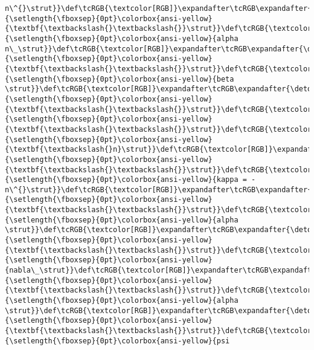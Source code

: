 \documentclass[landscape,letterpaper,10pt,english]{article}
\begin{document}
\begin{Verbatim}[commandchars=\\\{\}, frame=single, framerule=2mm, rulecolor=\color{outerrorbackground}]
n\^{}\strut}}\def\tcRGB{\textcolor[RGB]}\expandafter\tcRGB\expandafter{\detokenize{175,95,0}}{\setlength{\fboxsep}{0pt}\colorbox{ansi-yellow}{\textbf{\textbackslash{}\textbackslash{}}\strut}}\def\tcRGB{\textcolor[RGB]}\expandafter\tcRGB\expandafter{\detokenize{175,0,0}}{\setlength{\fboxsep}{0pt}\colorbox{ansi-yellow}{alpha n\_\strut}}\def\tcRGB{\textcolor[RGB]}\expandafter\tcRGB\expandafter{\detokenize{175,95,0}}{\setlength{\fboxsep}{0pt}\colorbox{ansi-yellow}{\textbf{\textbackslash{}\textbackslash{}}\strut}}\def\tcRGB{\textcolor[RGB]}\expandafter\tcRGB\expandafter{\detokenize{175,0,0}}{\setlength{\fboxsep}{0pt}\colorbox{ansi-yellow}{beta \strut}}\def\tcRGB{\textcolor[RGB]}\expandafter\tcRGB\expandafter{\detokenize{175,95,0}}{\setlength{\fboxsep}{0pt}\colorbox{ansi-yellow}{\textbf{\textbackslash{}\textbackslash{}}\strut}}\def\tcRGB{\textcolor[RGB]}\expandafter\tcRGB\expandafter{\detokenize{175,95,0}}{\setlength{\fboxsep}{0pt}\colorbox{ansi-yellow}{\textbf{\textbackslash{}\textbackslash{}}\strut}}\def\tcRGB{\textcolor[RGB]}\expandafter\tcRGB\expandafter{\detokenize{175,95,0}}{\setlength{\fboxsep}{0pt}\colorbox{ansi-yellow}{\textbf{\textbackslash{}n}\strut}}\def\tcRGB{\textcolor[RGB]}\expandafter\tcRGB\expandafter{\detokenize{175,95,0}}{\setlength{\fboxsep}{0pt}\colorbox{ansi-yellow}{\textbf{\textbackslash{}\textbackslash{}}\strut}}\def\tcRGB{\textcolor[RGB]}\expandafter\tcRGB\expandafter{\detokenize{175,0,0}}{\setlength{\fboxsep}{0pt}\colorbox{ansi-yellow}{kappa = -n\^{}\strut}}\def\tcRGB{\textcolor[RGB]}\expandafter\tcRGB\expandafter{\detokenize{175,95,0}}{\setlength{\fboxsep}{0pt}\colorbox{ansi-yellow}{\textbf{\textbackslash{}\textbackslash{}}\strut}}\def\tcRGB{\textcolor[RGB]}\expandafter\tcRGB\expandafter{\detokenize{175,0,0}}{\setlength{\fboxsep}{0pt}\colorbox{ansi-yellow}{alpha \strut}}\def\tcRGB{\textcolor[RGB]}\expandafter\tcRGB\expandafter{\detokenize{175,95,0}}{\setlength{\fboxsep}{0pt}\colorbox{ansi-yellow}{\textbf{\textbackslash{}\textbackslash{}}\strut}}\def\tcRGB{\textcolor[RGB]}\expandafter\tcRGB\expandafter{\detokenize{175,0,0}}{\setlength{\fboxsep}{0pt}\colorbox{ansi-yellow}{nabla\_\strut}}\def\tcRGB{\textcolor[RGB]}\expandafter\tcRGB\expandafter{\detokenize{175,95,0}}{\setlength{\fboxsep}{0pt}\colorbox{ansi-yellow}{\textbf{\textbackslash{}\textbackslash{}}\strut}}\def\tcRGB{\textcolor[RGB]}\expandafter\tcRGB\expandafter{\detokenize{175,0,0}}{\setlength{\fboxsep}{0pt}\colorbox{ansi-yellow}{alpha \strut}}\def\tcRGB{\textcolor[RGB]}\expandafter\tcRGB\expandafter{\detokenize{175,95,0}}{\setlength{\fboxsep}{0pt}\colorbox{ansi-yellow}{\textbf{\textbackslash{}\textbackslash{}}\strut}}\def\tcRGB{\textcolor[RGB]}\expandafter\tcRGB\expandafter{\detokenize{175,0,0}}{\setlength{\fboxsep}{0pt}\colorbox{ansi-yellow}{psi 
\end{Verbatim}
\end{document}
